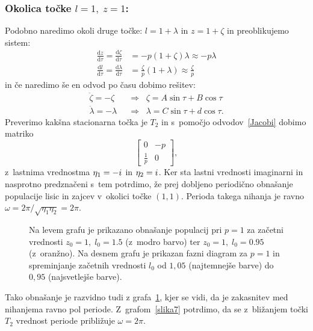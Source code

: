 \documentclass[a4paper,pdftex,10pt]{article}
\newcommand{\iu}{{i\mkern1mu}}	    %
\numberwithin{equation}{section} %
\numberwithin{figure}{section} %
\numberwithin{table}{section} %
\begin{document}
\subsubsection*{Okolica točke $l=1, \; z=1$:}
Podobno naredimo okoli druge točke: $l=1+\lambda$ in $z=1+\zeta$ in preoblikujemo sistem:
\begin{align}
    \frac{\mathrm{d}z}{\mathrm{d}\tau} = \frac{\mathrm{d}\zeta}{\mathrm{d}\tau} &= - p 
    (1+\zeta)\lambda \approx -p\lambda \\
    \frac{\mathrm{d}l}{\mathrm{d}\tau} = \frac{\mathrm{d}\lambda}{\mathrm{d}\tau}&= 
    \frac{\zeta}{p} (1 + \lambda) \approx \frac{\zeta}{p} 
\end{align}
in če naredimo še en odvod po času dobimo rešitev: 
\begin{align}
    \ddot{\zeta} = -\zeta \; \; &\Rightarrow \; \; \zeta=A\sin{\tau} + B\cos{\tau}\\
    \ddot{\lambda} = -\lambda \; \; &\Rightarrow \; \; \lambda=C\sin{\tau} + d\cos{\tau}.
\end{align}
Preverimo kakšna stacionarna točka je $T_2$ in s~pomočjo odvodov~\ref{Jacobi} dobimo
matriko
\begin{equation}
    \begin{bmatrix}
	0 & -p \\
	\frac{1}{p} & 0
    \end{bmatrix},
\end{equation}
z~lastnima vrednostma $\eta_1=-\iu$ in $\eta_2 =\iu$. Ker sta lastni vrednosti imaginarni
in nasprotno predznačeni s~tem potrdimo, že prej dobljeno periodično obnašanje populacije
lisic in zajcev v~okolici točke $(1,1)$. Perioda takega nihanja je ravno $\omega = 
2\pi/\sqrt{\eta_1\eta_2}=2\pi$. \\

\begin{figure}    
    \centering
    \resizebox{0.8\linewidth}{!}{}
    \caption{Na levem grafu je prikazano obnašanje populacij pri $p=1$ za začetni vrednosti
    $z_0=1,\; l_0=1.5$ (z~modro barvo) ter $z_0=1,\; l_0=0.95$ (z~oranžno). 
    Na desnem grafu je prikazan fazni diagram
    za $p=1$ in spreminjanje začetnih vrednosti $l_0$ od $1,05$ (najtemnejše barve) do 
    $0,95$ (najsvetlejše barve). }
    \label{slika4}
\end{figure}
Tako obnašanje je razvidno tudi z grafa~\ref{slika4}, kjer se vidi, da je 
zakasnitev med nihanjema ravno pol periode. Z~grafom~\ref{slika7} potrdimo, da se 
z~bližanjem točki $T_2$ vrednost periode približuje $\omega=2\pi$. 
\end{document}

